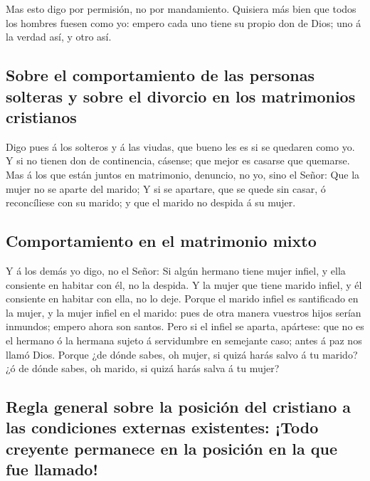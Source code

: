  Mas esto digo por permisión, no por mandamiento.
 Quisiera más bien que todos los hombres fuesen como yo:
empero cada uno tiene su propio don de Dios; uno á la verdad así, y otro
así.

\hypertarget{sobre-el-comportamiento-de-las-personas-solteras-y-sobre-el-divorcio-en-los-matrimonios-cristianos}{%
\subsection{Sobre el comportamiento de las personas solteras y sobre el
divorcio en los matrimonios
cristianos}\label{sobre-el-comportamiento-de-las-personas-solteras-y-sobre-el-divorcio-en-los-matrimonios-cristianos}}

 Digo pues á los solteros y á las viudas, que bueno les es
si se quedaren como yo.  Y si no tienen don de continencia,
cásense; que mejor es casarse que quemarse.  Mas á los que
están juntos en matrimonio, denuncio, no yo, sino el Señor: Que la mujer
no se aparte del marido;  Y si se apartare, que se quede
sin casar, ó reconcíliese con su marido; y que el marido no despida á su
mujer.

\hypertarget{comportamiento-en-el-matrimonio-mixto}{%
\subsection{Comportamiento en el matrimonio
mixto}\label{comportamiento-en-el-matrimonio-mixto}}

 Y á los demás yo digo, no el Señor: Si algún hermano tiene
mujer infiel, y ella consiente en habitar con él, no la despida.
 Y la mujer que tiene marido infiel, y él consiente en
habitar con ella, no lo deje.  Porque el marido infiel es
santificado en la mujer, y la mujer infiel en el marido: pues de otra
manera vuestros hijos serían inmundos; empero ahora son santos.
 Pero si el infiel se aparta, apártese: que no es el
hermano ó la hermana sujeto á servidumbre en semejante caso; antes á paz
nos llamó Dios.  Porque ¿de dónde sabes, oh mujer, si quizá
harás salvo á tu marido? ¿ó de dónde sabes, oh marido, si quizá harás
salva á tu mujer?

\hypertarget{regla-general-sobre-la-posiciuxf3n-del-cristiano-a-las-condiciones-externas-existentes-todo-creyente-permanece-en-la-posiciuxf3n-en-la-que-fue-llamado}{%
\subsection{Regla general sobre la posición del cristiano a las
condiciones externas existentes: ¡Todo creyente permanece en la posición
en la que fue
llamado!}\label{regla-general-sobre-la-posiciuxf3n-del-cristiano-a-las-condiciones-externas-existentes-todo-creyente-permanece-en-la-posiciuxf3n-en-la-que-fue-llamado}}

